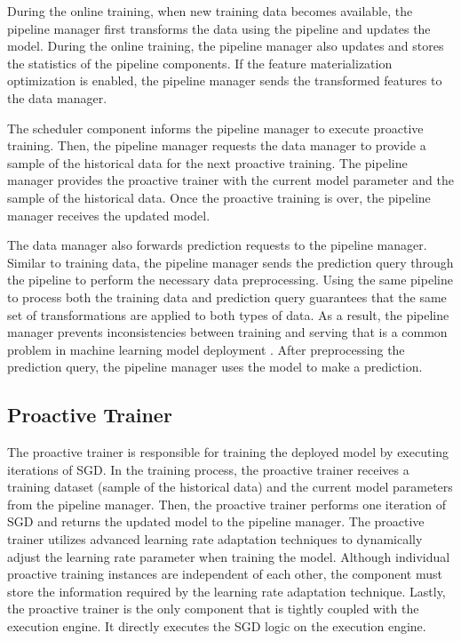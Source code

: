 During the online training, when new training data becomes available, the pipeline manager first transforms the data using the pipeline and updates the model.
During the online training, the pipeline manager also updates and stores the statistics of the pipeline components.
If the feature materialization optimization is enabled, the pipeline manager sends the transformed features to the data manager.

The scheduler component informs the pipeline manager to execute proactive training.
Then, the pipeline manager requests the data manager to provide a sample of the historical data for the next proactive training.
The pipeline manager provides the proactive trainer with the current model parameter and the sample of the historical data.
Once the proactive training is over, the pipeline manager receives the updated model.

The data manager also forwards prediction requests to the pipeline manager.
Similar to training data, the pipeline manager sends the prediction query through the pipeline to perform the necessary data preprocessing.
Using the same pipeline to process both the training data and prediction query guarantees that the same set of transformations are applied to both types of data.
As a result, the pipeline manager prevents inconsistencies between training and serving that is a common problem in machine learning model deployment \cite{baylor2017tfx}.
After preprocessing the prediction query, the pipeline manager uses the model to make a prediction.

\subsection{Proactive Trainer} 
The proactive trainer is responsible for training the deployed model by executing iterations of SGD.
In the training process, the proactive trainer receives a training dataset (sample of the historical data) and the current model parameters from the pipeline manager.
Then, the proactive trainer performs one iteration of SGD and returns the updated model to the pipeline manager.
The proactive trainer utilizes advanced learning rate adaptation techniques to dynamically adjust the learning rate parameter when training the model.
Although individual proactive training instances are independent of each other, the component must store the information required by the learning rate adaptation technique.
Lastly, the proactive trainer is the only component that is tightly coupled with the execution engine.
It directly executes the SGD logic on the execution engine.

